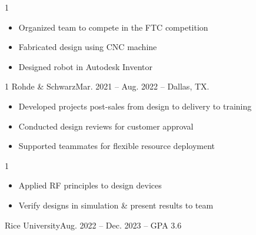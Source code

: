 \documentclass[10pt, letterpaper, ragged2e, withhyper]{AltaCV/altacv}
\def\Rohde{1}
\def\LMCO{1}
\def\FTCROBO{0}		%
\begin{document}
\begin{paracol}{2}
\if\FTCROBO1

\divider

\begin{itemize}
\item Organized team to compete in the FTC competition
\item Fabricated design using CNC machine
\item Designed robot in Autodesk Inventor
\end{itemize}
\fi

\iffalse

\divider

\cvevent{Project name}{Where \& for what}{Aug. 20XX - Dec. 20XX}{}
\begin{itemize}
\item First
\item Second
\item Last
\end{itemize}
\fi


\if\Rohde1
 {Rohde \& Schwarz}{Mar. 2021 -- Aug. 2022 -- Dallas, TX.}{}
\begin{itemize}
\item Developed projects post-sales from design to delivery to training
\item Conducted design reviews for customer approval
\item Supported teammates for flexible resource deployment
\end{itemize}
\divider
\fi

\if\LMCO1
 {}
\begin{itemize}
\item Applied RF principles to design devices
\item Verify designs in simulation \& present results to team
\end{itemize}
\fi

\switchcolumn

 {Rice University}{Aug. 2022 -- Dec. 2023 -- GPA 3.6}{}


\end{paracol}
\end{document}
